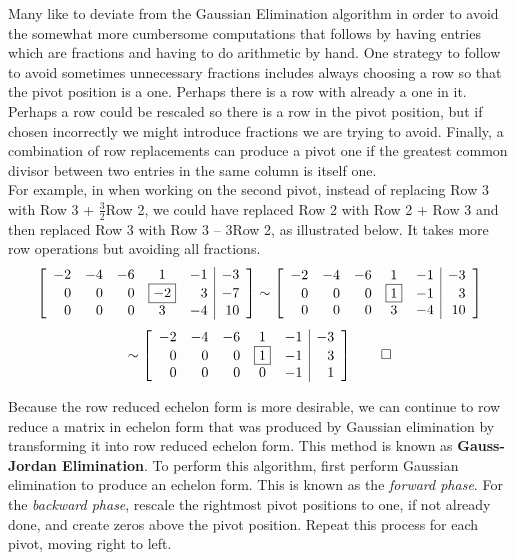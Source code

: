 \begin{Rem} Many like to deviate from the Gaussian Elimination algorithm in order to avoid the somewhat more cumbersome computations that follows by having entries which are fractions and having to do arithmetic by hand.  One strategy to follow to avoid sometimes unnecessary fractions includes always choosing a row so that the pivot position is a one. Perhaps there is a row with already a one in it. Perhaps a row could be rescaled so there is a row in the pivot position, but if chosen incorrectly we might introduce fractions we are trying to avoid. Finally, a combination of row replacements can produce a pivot one if the greatest common divisor between two entries in the same column is itself one. \\

For example, in  when working on the second pivot, instead of replacing Row 3 with Row 3 + $\frac{3}{2}$Row 2, we could have replaced Row 2 with Row 2 + Row 3 and then replaced Row 3 with Row 3 -- 3Row 2, as illustrated below. It takes more row operations but avoiding all fractions.
\[\mtx{rrrcr|r}{-2&-4&-6&1&-1&-3\\0&0&0&\fbox{$-2$}&3&-7\\0&0&0&3&-4&10} \sim \mtx{rrrcr|r}{-2&-4&-6&1&-1&-3\\0&0&0&\fbox{$1$}&-1&3\\0&0&0&3&-4&10}\]\[\sim \mtx{rrrcr|r}{-2&-4&-6&1&-1&-3\\0&0&0&\fbox{$1$}&-1&3\\0&0&0&0&-1&1} \qedhere\]
\end{Rem}\vs

Because the row reduced echelon form is more desirable, we can continue to row reduce a matrix in echelon form that was produced by Gaussian elimination by transforming it into row reduced echelon form. This method is known as \textbf{Gauss-Jordan Elimination}. To perform this algorithm, first perform Gaussian elimination to produce an echelon form. This is known as the \emph{forward phase}. For the \emph{backward phase}, rescale the rightmost pivot positions to one, if not already done, and create zeros above the pivot position. Repeat this process for each pivot, moving right to left. \\

